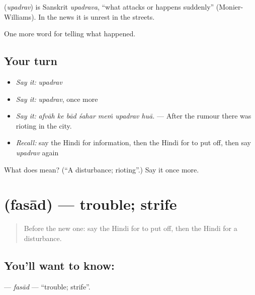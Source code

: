 \begin{cousinweb}
\textbf{} (\emph{upadrav}) is Sanskrit \emph{upadrava}, \textquotedblleft{}what attacks or happens suddenly\textquotedblright{} (Monier-Williams). In the news it is unrest in the streets.
\end{cousinweb}

\begin{grammarlens}[title={What you've built}]
One more word for telling what happened.
\end{grammarlens}

\subsection*{Your turn}
\begin{itemize}
\raggedright
  \item \emph{Say it:} \emph{upadrav}
  \item \emph{Say it:} \emph{upadrav}, once more
  \item \emph{Say it:} \emph{afvāh ke bād śahar meṁ upadrav huā.} — After the rumour there was rioting in the city.
  \item \emph{Recall:} say the Hindi for information, then the Hindi for to put off, then say \emph{upadrav} again
\end{itemize}

\begin{tcolorbox}[breakable,colback=teal!4,colframe=teal!35!black,title={Before you move on}]
What does  mean? (\textquotedblleft{}A disturbance; rioting\textquotedblright{}.) Say it once more.
\end{tcolorbox}
\section[\texorpdfstring{\hi{फ़साद} (fasād)}{फ़साद (fasād)}]{ (fasād) — trouble; strife}

\label{lesson:HI-C316-fasad}



\begin{quote}
Before the new one: say the Hindi for to put off, then the Hindi for a disturbance.
\end{quote}

\subsection*{You'll want to know: }
\textbf{} — \emph{fasād} — \textquotedblleft{}trouble; strife\textquotedblright{}.

